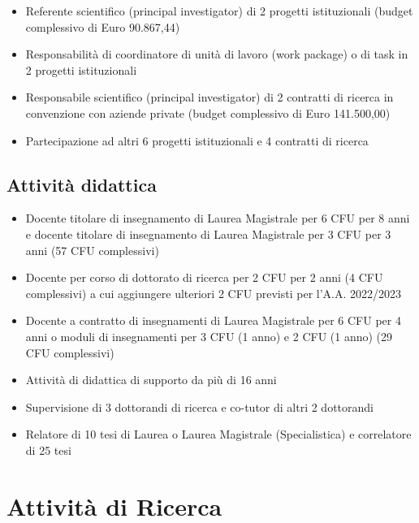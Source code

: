 \documentclass[11pt]{article}
\begin{document}
\begin{itemize}
\item Referente scientifico (principal investigator) di 2 progetti istituzionali (budget complessivo di Euro 90.867,44)
\item Responsabilit\`a di coordinatore di unit\`a di lavoro (work package) o di task in 2 progetti istituzionali
\item Responsabile scientifico (principal investigator) di 2 contratti di ricerca in convenzione con aziende private (budget complessivo di Euro 141.500,00)
\item Partecipazione ad altri 6 progetti istituzionali e 4 contratti di ricerca
\end{itemize}


\subsection*{Attivit\`a didattica}

\begin{itemize}
\item Docente titolare di insegnamento di Laurea Magistrale per 6 CFU per 8 anni e docente titolare di insegnamento di Laurea Magistrale per 3 CFU per 3 anni (57 CFU complessivi)
\item Docente per corso di dottorato di ricerca per 2 CFU per 2 anni (4 CFU complessivi) a cui aggiungere ulteriori 2 CFU previsti per l'A.A. 2022/2023
\item Docente a contratto di insegnamenti di Laurea Magistrale per 6 CFU per 4 anni o moduli di insegnamenti per 3 CFU (1 anno) e 2 CFU (1 anno) (29 CFU complessivi) 
\item Attivit\`a di didattica di supporto da pi\`u di 16 anni
\item Supervisione di 3 dottorandi di ricerca e co-tutor di altri 2 dottorandi
\item Relatore di 10 tesi di Laurea o Laurea Magistrale (Specialistica) e correlatore di 25 tesi
\end{itemize}



\section{Attivit\`a di Ricerca}
\end{document}
